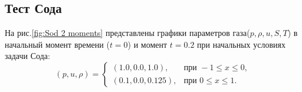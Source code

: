 \documentclass[a4paper,12pt]{extarticle}
\begin{document}
\subsection{Тест Сода}
На рис.\ref{fig:Sod 2 moments} представлены графики параметров газа($p,\rho,u, S, T$) в начальный момент времени ($t=0$) и момент $t=0.2$ при начальных условиях задачи Сода: 
\begin{equation}
        (p, u, \rho) =
        \begin{cases}
            (1.0, 0.0, 1.0), & \text{при } -1\leq x\leq0,\\
            (0.1, 0.0, 0.125), & \text{при } 0\leq x\leq1.
        \end{cases}
\end{equation}

\begin{figure}[h]
\begin{minipage}[h]{0.49\linewidth}
\end{minipage}
\hfill
\begin{minipage}[h]{0.49\linewidth}

\end{minipage}
\end{figure}
\end{document}
